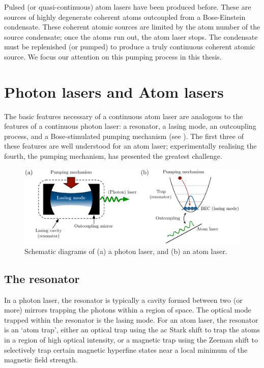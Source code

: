 Pulsed (or quasi-continuous) atom lasers have been produced before.  These are sources of highly degenerate coherent atoms outcoupled from a Bose-Einstein condensate.  These coherent atomic sources are limited by the atom number of the source condensate; once the atoms run out, the atom laser stops.  The condensate must be replenished (or pumped) to produce a truly continuous coherent atomic source.  We focus our attention on this pumping process in this thesis.


\section{Photon lasers and Atom lasers}
\label{Introduction:PhotonAndAtomLasers}

The basic features necessary of a continuous atom laser are analogous to the features of a continuous photon laser: a resonator, a lasing mode, an outcoupling process, and a Bose-stimulated pumping mechanism (see ).  The first three of these features are well understood for an atom laser; experimentally realising the fourth, the pumping mechanism, has presented the greatest challenge.

\begin{figure}
    \centering
    \includegraphics[width=14cm]{LaserAtomLaserComparison}
    \caption{
        \label{Introduction:LaserAtomLaserComparison}
        Schematic diagrams of (a) a photon laser, and (b) an atom laser.
    }
\end{figure}

\subsection{The resonator}

In a photon laser, the resonator is typically a cavity formed between two (or more) mirrors trapping the photons within a region of space.  The optical mode trapped within the resonator is the lasing mode.  For an atom laser, the resonator is an `atom trap', either an optical trap using the ac Stark shift to trap the atoms in a region of high optical intensity, or a magnetic trap using the Zeeman shift to selectively trap certain magnetic hyperfine states near a local minimum of the magnetic field strength.

